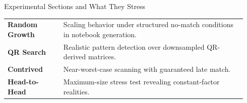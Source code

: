 \begin{frame}{Experimental Sections and What They Stress}
\small
\begin{tabular}{>{\bfseries}p{0.22\linewidth}p{0.72\linewidth}}
Random Growth & Scaling behavior under structured no-match conditions in notebook generation. \\
QR Search & Realistic pattern detection over downsampled QR-derived matrices. \\
Contrived & Near-worst-case scanning with guaranteed late match. \\
Head-to-Head & Maximum-size stress test revealing constant-factor realities. \\
\end{tabular}

\vspace{0.5em}
\end{frame}
